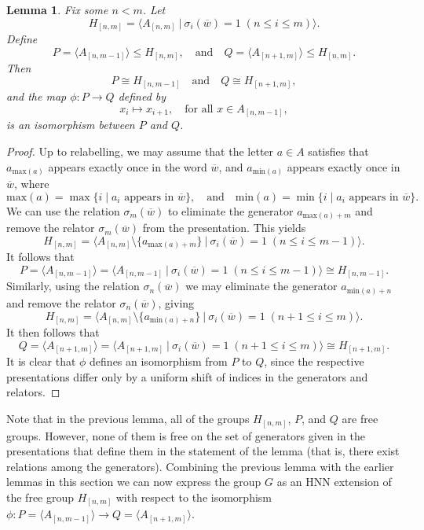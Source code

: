 \documentclass[11pt]{amsart}
\newcommand{\Ggen}[1]{\bigl\langle #1 \bigr\rangle}
\newcommand{\Gpres}[2]{\bigl\langle #1\:|\:#2 \bigr\rangle}
\theoremstyle{plain}
\newtheorem{lemma}[theorem]{Lemma}
\theoremstyle{definition}
\begin{document}
\begin{lemma}\label{lem:keyforHNN} 
Fix some $n < m$. Let
\[
H_{[n,m]} = \Gpres{A_{[n,m]}}{ \sigma_i(\overline{w}) = 1 \; (n \leq i \leq m)}.
\]
Define
\[
P = \Ggen{A_{[n,m-1]}} \leq H_{[n,m]},  
\quad \text{and} \quad
Q = \Ggen{A_{[n+1,m]}} \leq H_{[n,m]}.
\]
Then
\[
P \cong H_{[n,m-1]} 
\quad \text{and} \quad 
Q \cong H_{[n+1,m]},
\]
and the map $\phi: P \rightarrow Q$ defined by
\[
x_i \mapsto x_{i+1}, \quad \text{for all } x \in A_{[n,m-1]},
\]
is an isomorphism between $P$ and $Q$.
\end{lemma}


\begin{proof}
Up to relabelling, we may assume that the letter $a \in A$ satisfies that $a_{\mathrm{max}(a)}$ appears exactly once in the word $\overline{w}$, and $a_{\mathrm{min}(a)}$ appears exactly once in $\overline{w}$, where
\[
\mathrm{max}(a) = \max\{ i \mid a_i \text{ appears in } \overline{w} \}, 
\quad \text{and} \quad  
\mathrm{min}(a) = \min\{ i \mid a_i \text{ appears in } \overline{w} \}.
\]
We can use the relation $\sigma_m(\overline{w})$
to eliminate the generator $a_{\mathrm{max}(a) + m}$ and remove the relator $\sigma_m(\overline{w})$ from the presentation. This yields
\[
H_{[n,m]} = \Gpres{A_{[n,m]} \setminus \{ a_{\mathrm{max}(a) + m} \}}{\sigma_i(\overline{w}) = 1 \; (n \leq i \leq m-1)}.
\]
It follows that
\[
P = \Ggen{A_{[n,m-1]}} = 
\Gpres{A_{[n,m-1]}}{\sigma_i(\overline{w}) = 1 \; (n \leq i \leq m-1)} 
\cong H_{[n,m-1]}.
\]
Similarly, using the relation
$\sigma_n(\overline{w})$
we may eliminate the generator $a_{\mathrm{min}(a) + n}$ and remove the relator $\sigma_n(\overline{w})$, giving
\[
H_{[n,m]} = \Gpres{A_{[n,m]} \setminus \{ a_{\mathrm{min}(a) + n} \}}{\sigma_i(\overline{w}) = 1 \; (n+1 \leq i \leq m)}.
\]
It then follows that
\[
Q = \Ggen{A_{[n+1,m]}} = 
\Gpres{A_{[n+1,m]}}{\sigma_i(\overline{w}) = 1 \; (n+1 \leq i \leq m)} 
\cong H_{[n+1,m]}.
\]
It is clear that $\phi$ defines an isomorphism from \( P \) to \( Q \), since the respective presentations differ only by a uniform shift of indices in the generators and relators.
\end{proof}

Note that in the previous lemma, all of the groups $H_{[n,m]}$, $P$, and $Q$ are free groups. However, none of them is free on the set of generators given in the presentations that define them in the statement of the lemma (that is, there exist relations among the generators).
Combining the previous lemma with the earlier lemmas in this section we can now express the group $G$ as an HNN extension of the free group $H_{[n,m]}$ with respect to the isomorphism  $\phi: P = \Ggen{A_{[n,m-1]}} \rightarrow Q = \Ggen{A_{[n+1,m]}}$.
\end{document}
